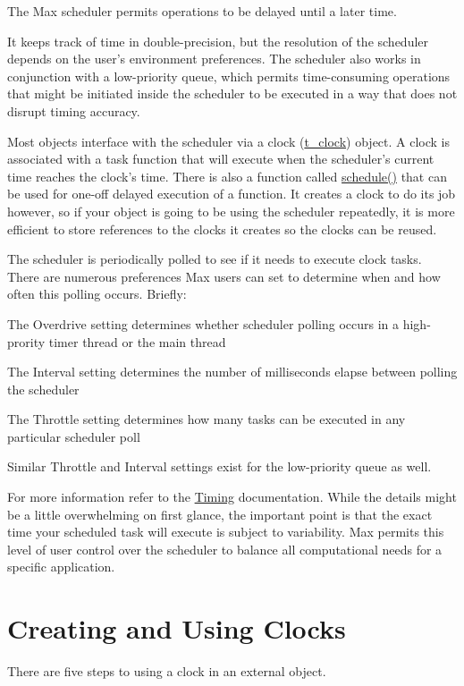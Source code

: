 The Max scheduler permits operations to be delayed until a later time.

It keeps track of time in double-\/precision, but the resolution of the scheduler depends on the user's environment preferences. The scheduler also works in conjunction with a low-\/priority queue, which permits time-\/consuming operations that might be initiated inside the scheduler to be executed in a way that does not disrupt timing accuracy.

Most objects interface with the scheduler via a clock (\hyperlink{group__clocks_ga09c0580122113b4db2517ff8e7c8b0f2}{t\_\-clock}) object. A clock is associated with a task function that will execute when the scheduler's current time reaches the clock's time. There is also a function called \hyperlink{group__threading_ga1eb8ec7623f0806dd079d7be708c19a8}{schedule()} that can be used for one-\/off delayed execution of a function. It creates a clock to do its job however, so if your object is going to be using the scheduler repeatedly, it is more efficient to store references to the clocks it creates so the clocks can be reused.

The scheduler is periodically polled to see if it needs to execute clock tasks. There are numerous preferences Max users can set to determine when and how often this polling occurs. Briefly:


\begin{DoxyItemize}
\item The Overdrive setting determines whether scheduler polling occurs in a high-\/prority timer thread or the main thread
\item The Interval setting determines the number of milliseconds elapse between polling the scheduler
\item The Throttle setting determines how many tasks can be executed in any particular scheduler poll
\end{DoxyItemize}

Similar Throttle and Interval settings exist for the low-\/priority queue as well.

For more information refer to the \hyperlink{group__sched}{Timing} documentation. While the details might be a little overwhelming on first glance, the important point is that the exact time your scheduled task will execute is subject to variability. Max permits this level of user control over the scheduler to balance all computational needs for a specific application.\hypertarget{chapter_scheduler_chapter_scheduler_clocks}{}\section{Creating and Using Clocks}\label{chapter_scheduler_chapter_scheduler_clocks}
There are five steps to using a clock in an external object.


